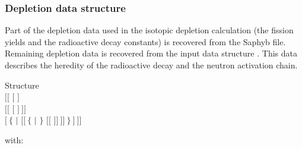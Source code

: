 \subsubsection{Depletion data structure}\label{sect:descdepld}

Part of the depletion data used in the isotopic depletion calculation (the fission yields and the
radioactive decay constants) is recovered from the Saphyb file. Remaining depletion data is
recovered from the input data structure . This data describes the heredity of the radioactive decay
and the neutron activation chain.

\begin{DataStructure}{Structure }
 \\
\hskip 0.3cm $[[$  $[$  $]$ \\
\hskip 0.6cm $[[$  $[$  $]~]]$ \\
\hskip 0.6cm $[~\{$  $|$  $[[~\{$  $|$  $\}$
$[[$   $]]~]]~\}~]~]]$\\
\end{DataStructure}

\noindent
with:


